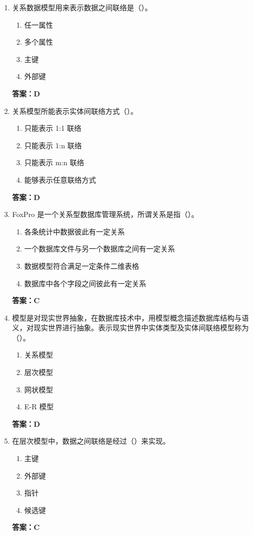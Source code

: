 \documentclass[12pt, a4paper]{article}
\begin{document}
\begin{enumerate}[label=\arabic*.]
    \item 关系数据模型用来表示数据之间联络是（\quad）。
    \begin{enumerate}
        \item 任一属性
        \item 多个属性
        \item 主键
        \item 外部键
    \end{enumerate}
    \textbf{答案：D}

    \item 关系模型所能表示实体间联络方式（\quad）。
    \begin{enumerate}
        \item 只能表示 1:1 联络
        \item 只能表示 1:n 联络
        \item 只能表示 m:n 联络
        \item 能够表示任意联络方式
    \end{enumerate}
    \textbf{答案：D}

    \item FoxPro 是一个关系型数据库管理系统，所谓关系是指（\quad）。
    \begin{enumerate}
        \item 各条统计中数据彼此有一定关系
        \item 一个数据库文件与另一个数据库之间有一定关系
        \item 数据模型符合满足一定条件二维表格
        \item 数据库中各个字段之间彼此有一定关系
    \end{enumerate}
    \textbf{答案：C}

    \item 模型是对现实世界抽象，在数据库技术中，用模型概念描述数据库结构与语义，对现实世界进行抽象。表示现实世界中实体类型及实体间联络模型称为（\quad）。
    \begin{enumerate}
        \item 关系模型
        \item 层次模型
        \item 网状模型
        \item E-R 模型
    \end{enumerate}
    \textbf{答案：D}

    \item 在层次模型中，数据之间联络是经过（\quad）来实现。
    \begin{enumerate}
        \item 主键
        \item 外部键
        \item 指针
        \item 候选键
    \end{enumerate}
    \textbf{答案：C}


\end{enumerate}
\end{document}
